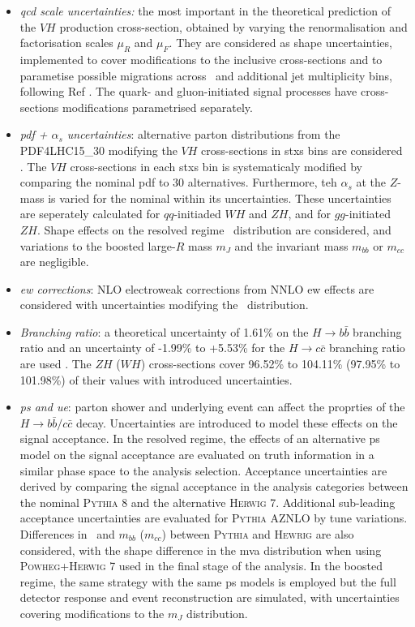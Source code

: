 \begin{itemize}
    \item \textit{\gls{qcd} scale uncertainties:} the most important in the theoretical prediction of the $VH$ production cross-section, obtained by varying the renormalisation and factorisation scales $\mu_R$ and $\mu_F$. They are considered as shape uncertainties, implemented to cover modifications to the inclusive cross-sections and to parametise possible migrations across \ptv\ and additional jet multiplicity bins, following Ref \cite{ATL-PHYS-PUB-2018-035}. The quark- and gluon-initiated signal processes have cross-sections modifications parametrised separately. 
    \item \textit{\gls{pdf} + $\alpha_s$ uncertainties}: alternative parton distributions from the \textsc{PDF4LHC15\_30} modifying the $VH$ cross-sections in \gls{stxs} bins are considered  \cite{Butterworth:2015oua}. The $VH$ cross-sections in each \gls{stxs} bin is systematicaly modified by comparing the nominal \gls{pdf} to 30 alternatives. Furthermore, teh $\alpha_s$ at the $Z$-mass is varied for the nominal within its uncertainties. These uncertainties are seperately calculated for $qq$-initiaded $WH$ and $ZH$, and for $gg$-initiated $ZH$. Shape effects on the resolved regime \ptv\ distribution are considered, and variations to the boosted large-$R$ mass $m_J$ and the invariant mass $m_{bb}$ or $m_{cc}$ are negligible.
    \item \textit{\gls{ew} corrections}: NLO electroweak corrections from NNLO \gls{ew} effects are considered with uncertainties modifying the \ptv\ distribution.
    \item \textit{Branching ratio}: a theoretical uncertainty of 1.61\% on the $H \rightarrow{b\bar{b}}$ branching ratio and an uncertainty of -1.99\% to +5.53\% for the $H \rightarrow{c\bar{c}}$ branching ratio are used \cite{LHCHiggsCrossSectionWorkingGroup:2016ypw}. The $ZH$ ($WH$) cross-sections cover 96.52\% to 104.11\% (97.95\% to 101.98\%) of their values with introduced uncertainties.
    \item \textit{\gls{ps} and \gls{ue}}: parton shower and underlying event can affect the proprties of the $H \rightarrow b\bar{b} / c\bar{c}$ decay. Uncertainties are introduced to model these effects on the signal acceptance. In the resolved regime, the effects of an alternative \gls{ps} model on the signal acceptance are evaluated on truth information in a similar phase space to the analysis selection. Acceptance uncertainties are derived by comparing the signal acceptance in the analysis categories between the nominal \textsc{Pythia} 8 and the alternative \textsc{Herwig} 7. Additional sub-leading acceptance uncertainties are evaluated for \textsc{Pythia} AZNLO by tune variations. Differences in \ptv\ and $m_{bb}$ ($m_{cc}$) between \textsc{Pythia} and \textsc{Hewrig} are also considered, with the shape difference in the \gls{mva} distribution when using \textsc{Powheg}+\textsc{Herwig} 7 used in the final stage of the analysis. In the boosted regime, the same strategy with the same \gls{ps} models is employed but the full detector response and event reconstruction are simulated, with uncertainties covering modifications to the $m_J$ distribution.
\end{itemize}

